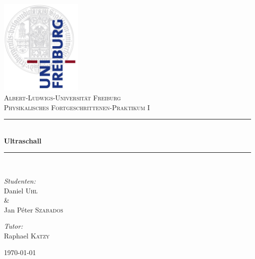 
\begin{titlepage}

\begin{center}



\includegraphics[width=0.3\textwidth]{Bilder/logo}\\[1.2cm]    

\textsc{\LARGE Albert-Ludwigs-Universit\"at Freiburg}\\[1.75cm]

\textsc{\Large Physikalisches Fortgeschrittenen-Praktikum I}\\[0.75cm]



\newcommand{\HRule}{\rule{\linewidth}{0.5mm}}
\HRule \\[0.5cm]
{ \huge \bfseries Ultraschall}\\[0.5cm]

\HRule \\[1.75cm]


\begin{minipage}{0.4\textwidth}
\begin{flushleft} \large
\emph{Studenten:}\\
Daniel \textsc{Uhl}\\ \setlength{\parindent}{1.25cm} \& 
\setlength{\parindent}{0cm} \\ Jan P\'eter \textsc{Szabados} 
\end{flushleft}
\end{minipage}
\hfill
\begin{minipage}{0.4\textwidth}
\begin{flushright} \large
\emph{Tutor:} \\
Raphael \textsc{Katzy}\\
\end{flushright}
\end{minipage}

\vfill


{\large \today}

\end{center}

\end{titlepage}